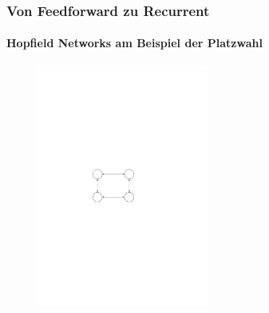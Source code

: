 \documentclass[german,aspectratio=169]{beamer}
\begin{document}
\begin{frame}
	\frametitle{Von Feedforward zu Recurrent}
	\framesubtitle{Hopfield Networks am Beispiel der Platzwahl}
	\begin{figure}
	\includegraphics[width=0.5\textwidth]{desk-example}
	\end{figure}
\end{frame}
\end{document}
